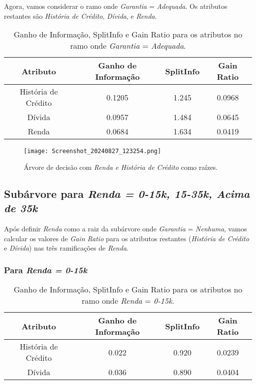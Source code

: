 \documentclass[a4paper,12pt]{article}
\begin{document}
Agora, vamos considerar o ramo onde \textit{Garantia} = \textit{Adequada}. Os atributos restantes são \textit{História de Crédito}, \textit{Dívida}, e \textit{Renda}.

\begin{table}[H]
\centering
\begin{tabular}{|c|c|c|c|}
\hline
\textbf{Atributo} & \textbf{Ganho de Informação} & \textbf{SplitInfo} & \textbf{Gain Ratio} \\
\hline
História de Crédito & 0.1205 & 1.245 & 0.0968 \\
\hline
Dívida & 0.0957 & 1.484 & 0.0645 \\
\hline
Renda & 0.0684 & 1.634 & 0.0419 \\
\hline
\end{tabular}
\caption{Ganho de Informação, SplitInfo e Gain Ratio para os atributos no ramo onde \textit{Garantia} = \textit{Adequada}.}
\label{tab:gain-ratio-adequada}
\end{table}


\begin{figure}[H]
    \centering
    \texttt{[image: Screenshot\_20240827\_123254.png]} %
    \caption{Árvore de decisão com \textit{Renda e História de Crédito} como raízes.}
    \label{fig:arvore-renda-historia}
\end{figure}

\subsection{Subárvore para \textit{Renda = 0-15k, 15-35k, Acima de 35k}}

Após definir \textit{Renda} como a raiz da subárvore onde \textit{Garantia} = \textit{Nenhuma}, vamos calcular os valores de \textit{Gain Ratio} para os atributos restantes (\textit{História de Crédito} e \textit{Dívida}) nas três ramificações de \textit{Renda}.

\subsubsection{Para \textit{Renda = 0-15k}}

\begin{table}[H]
\centering
\begin{tabular}{|c|c|c|c|}
\hline
\textbf{Atributo} & \textbf{Ganho de Informação} & \textbf{SplitInfo} & \textbf{Gain Ratio} \\
\hline
História de Crédito & 0.022 & 0.920 & 0.0239 \\
\hline
Dívida & 0.036 & 0.890 & 0.0404 \\
\hline
\end{tabular}
\caption{Ganho de Informação, SplitInfo e Gain Ratio para os atributos no ramo onde \textit{Renda} = \textit{0-15k}.}
\label{tab:gain-ratio-renda-0-15k}
\end{table}
\end{document}
